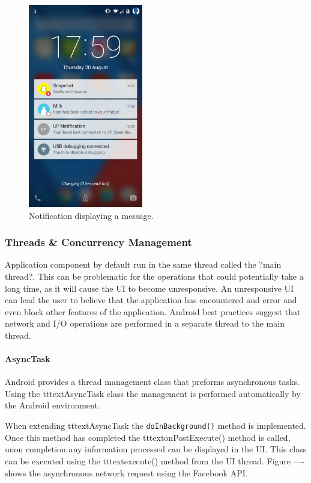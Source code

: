 \documentclass[a4paper, 11pt]{article}
\begin{document}
\begin{figure}[!htbp]
\centering
\includegraphics[width=5cm]{notification}
\caption{Notification displaying a message.} \label{fig:notification}
\end{figure}


\subsubsection{Threads \& Concurrency Management}
Application component by default run in the same thread called the ?main thread?. This can be problematic for the operations that could potentially take a long time, as it will cause the UI to become unresponsive. An unresponsive UI can lead the user to believe that the application has encountered and error and even block other features of the application. Android best practices suggest that network and I/O operations are performed in a separate thread to the main thread.

\paragraph{AsyncTask}Android provides a thread management class that preforms asynchronous tasks. Using the tttext{AsyncTask} class the management is performed automatically by the Android environment. 

When extending tttext{AsyncTask} the \texttt{doInBackground()} method is implemented. Once this method has completed the tttext{onPostExecute()} method is called, unon completion any information processed can be displayed in the UI.  This class can be executed using the tttext{execute()} method from the UI thread. Figure ---- shows the asynchronous network request using the Facebook API.
\end{document}
